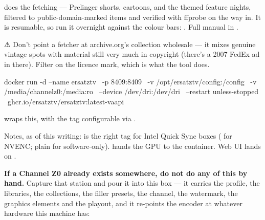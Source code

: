 \documentclass[fontpath=fonts/,logopath=logo/]{riposte-doc}
\begin{document}
\ripmarker{}   does the fetching — Prelinger shorts, cartoons, and the themed feature nights, filtered to public-domain-marked items and verified with ffprobe on the way in. It is resumable, so run it overnight against the colour bars: . Full manual in .

\begin{ripnote}
⚠ Don't point a fetcher at archive.org's  collection wholesale — it mixes genuine vintage spots with material still very much in copyright (there's a 2007 FedEx ad in there). Filter on the licence mark, which is what the tool does.
\end{ripnote}



\ripcodeopen
{}
\begin{ripcodeblock}
docker run -d --name ersatztv \
  -p 8409:8409 \
  -v /opt/ersatztv/config:/config \
  -v /media/channelz0:/media:ro \
  --device /dev/dri:/dev/dri \
  --restart unless-stopped \
  ghcr.io/ersatztv/ersatztv:latest-vaapi
\end{ripcodeblock}
\ripcodesizereset\ripcodeclose

\ripmarker{}   wraps this, with the tag configurable via .

Notes, as of this writing:  is the right tag for Intel Quick Sync boxes ( for NVENC; plain  for software-only).  hands the GPU to the container. Web UI lands on .



\textbf{If a Channel Z0 already exists somewhere, do not do any of this by hand.} Capture that station and pour it into this box — it carries the profile, the libraries, the collections, the filler presets, the channel, the watermark, the graphics elements and the playout, and it re-points the encoder at whatever hardware this machine has:
\end{document}
